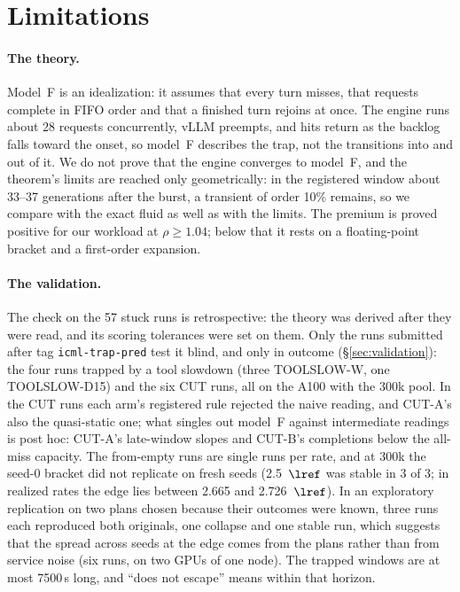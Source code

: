 \section{Limitations}\label{sec:limits}

\paragraph{The theory.} Model~F is an idealization: it assumes that every turn misses, that requests complete in FIFO order and
that a finished turn rejoins at once. The engine runs about 28 requests concurrently, vLLM preempts, and hits return as the backlog
falls toward the onset, so model~F describes the trap, not the transitions into and out of it. We do not prove that the engine
converges to model~F, and the theorem's limits are reached only geometrically: in the registered window about 33--37 generations
after the burst, a transient of order 10\% remains, so we compare with the exact fluid as well as with the limits. The premium is
proved positive for our workload at $\rho\ge1.04$; below that it rests on a floating-point bracket and a first-order expansion.

\paragraph{The validation.} The check on the 57 stuck runs is retrospective: the theory was derived after they were read, and its
scoring tolerances were set on them. Only the runs submitted after tag \texttt{icml-trap-pred} test it blind, and only in
outcome (\S\ref{sec:validation}): the four runs trapped by a tool slowdown (three TOOLSLOW-W, one TOOLSLOW-D15) and the six
CUT runs, all on the A100 with the 300k pool. In the CUT runs each arm's registered rule rejected the naive reading, and CUT-A's also the quasi-static one; what singles out model~F
against intermediate readings is post hoc: CUT-A's late-window slopes and CUT-B's completions below the all-miss capacity. The from-empty runs are single runs per rate, and at
300k the seed-0 bracket did not replicate on fresh seeds (2.5~$\lref$ was stable in 3 of 3; in realized rates the edge lies between
2.665 and 2.726~$\lref$). In an exploratory replication on two plans chosen because their outcomes were known, three runs each
reproduced both originals, one collapse and one stable run, which suggests that the spread across seeds at the edge comes from the
plans rather than from service noise (six runs, on two GPUs of one node). The trapped windows are at most 7500\,s long, and ``does not escape'' means
within that horizon.

